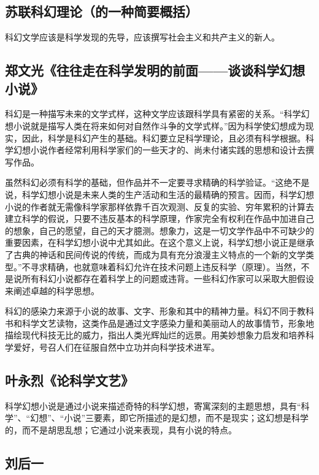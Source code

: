 \documentclass{ctexart}
\begin{document}
\subsection{苏联科幻理论（的一种简要概括）}

    科幻文学应该是科学发现的先导，应该撰写社会主义和共产主义的新人。



\subsection{郑文光《往往走在科学发明的前面——谈谈科学幻想小说》}

    科幻是一种描写未来的文学式样，这种文学应该跟科学具有紧密的关系。“科学幻想小说就是描写人类在将来如何对自然作斗争的文学式样。”因为科学使幻想成为现实，因此，科学是科幻产生的基础。科幻要立足科学理论，且必须有科学根据。科学幻想小说作者经常利用科学家们的一些天才的、尚未付诸实践的思想和设计去撰写作品。

    虽然科幻必须有科学的基础，但作品并不一定要寻求精确的科学验证。“这绝不是说，科学幻想小说是未来人类的生产活动和生活的最精确的预言。因而，科学幻想小说的作者就无需像科学家那样依靠千百次观测、反复的实验、穷年累积的计算去建立科学的假说，只要不违反基本的科学原理，作家完全有权利在作品中加进自己的想象，自己的愿望，自己的天才臆测。想象力，这是一切文学作品中不可缺少的重要因素，在科学幻想小说中尤其如此。在这个意义上说，科学幻想小说正是继承了古典的神话和民间传说的传统，而成为具有充分浪漫主义特点的一个新的文学类型。”不寻求精确，也就意味着科幻允许在技术问题上违反科学（原理）。当然，不是说所有科幻小说都存在着科学上的问题或违背。一些科幻作家可以采取大胆假设来阐述卓越的科学思想。

    科幻的感染力来源于小说的故事、文字、形象和其中的精神力量。科幻不同于教科书和科学文艺读物，这类作品是通过文字感染力量和美丽动人的故事情节，形象地描绘现代科技无比的威力，指出人类光辉灿烂的远景。用美妙想象力启发和培养科学爱好，号召人们在征服自然中立功并向科学技术进军。



\subsection{叶永烈《论科学文艺》}

    科学幻想小说是通过小说来描述奇特的科学幻想，寄寓深刻的主题思想，具有“科学”、“幻想”、“小说”三要素，即它所描述的是幻想，而不是现实；这幻想是科学的，而不是胡思乱想；它通过小说来表现，具有小说的特点。


\subsection{刘后一}
\end{document}
